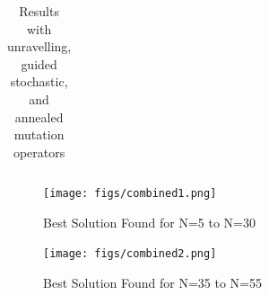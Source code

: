 \documentclass{article}
\begin{document}
\begin{table}[]
\begin{tabular}{cccc|cccc}
	\hline 
	\end{tabular}
	\caption{Results with unravelling, guided stochastic, and annealed mutation
	operators}
 \end{table}

 \begin{figure}
	\texttt{[image: figs/combined1.png]}
	\caption{Best Solution Found for N=5 to N=30}
	\label{fig:combined1}
\end{figure}

 \begin{figure}
	\texttt{[image: figs/combined2.png]}
	\caption{Best Solution Found for N=35 to N=55}
	\label{fig:combined2}
\end{figure}



	

\pagebreak

\printbibliography
\end{document}
